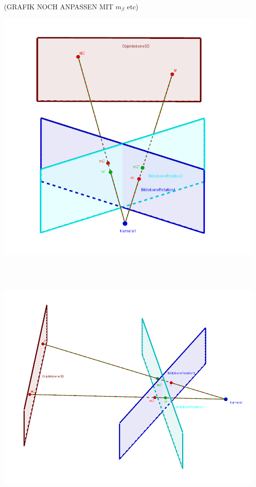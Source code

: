 (GRAFIK NOCH ANPASSEN MIT $m_\beta$ etc)\\
\begin{minipage}{\linewidth}
	\centering
	\includegraphics[width=0.8\linewidth]{images/Homographie_rotation_1.png}
\end{minipage}\\ \\

\begin{minipage}{\linewidth}
	\centering
	\includegraphics[width=0.8\linewidth]{images/Homographie_rotation_2.png}
\end{minipage}\\ \\

